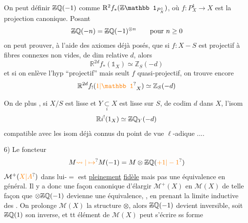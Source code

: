 On peut définir $\deleted{\mathbb Z}\mathbb Q(-1)$ comme %
$\mathrm R^2 f_*(\deleted{\mathbb Z}\mathbb 1_{P^1_X})$, où $f:P_X^1\longrightarrow X$ est la %
projection canonique. Posant %
\[
\deleted{\mathbb Z}\mathbb Q(-n)=\deleted{\mathbb Z}\mathbb Q(-1)^{\otimes n}\qquad\text{pour }n\geq0 %
\]
on peut prouver, à l'aide des %
axiomes déjà posés, que si $f:X-S$ %
est  projectif à fibres  connexes non vides, %
 de dim relative $d$, alors %
\[
\mathbb R^{2d}f_*(\mathbb 1_X)\simeq\mathbb Z_S(-d) %
\]
et si on enlève l'hyp ``projectif'' mais %
seult $f$ quasi-projectif, on trouve encore %
\[
\mathbb R^{2d} f_!(\unsure{1|\mathbb 1}_X)\simeq\mathbb Z_S(-d) %
\]

On   de plus ,  si $X/S$ est %
lisse et $Y\underset{i}{\subset}X$ est lisse sur $S$, de codim %
$d$ dans $X$, l'isom %
\[
\mathbb R i^!(1_X)\simeq\deleted{\mathbb Z}\mathbb Q_Y(-d) %
\]
compatible avec les isom déjà connus %
du point de vue $\ell$-adique .... %

6)  %
Le foncteur %
\[
M\unsure{\leadsto|\mapsto}M(-1)=M\otimes\deleted{\mathbb Z}\mathbb Q(\unsure{+1|-1}) %
\]
 $\mathcal M^+(\unsure{X|A})$ dans lui-$=$ est \uline{pleinement} \uline{fidèle} %
mais pas une équivalence en général. %
Il y a donc une façon canonique %
d'élargir $\mathcal M^+(X)$ en  $\mathcal M(X)$ de telle façon %
que  $\otimes\deleted{\mathbb Z}\mathbb Q(-1)$ devienne une équivalence, %
, en prenant la limite inductive %
des %
. On prolonge %
$\mathcal M(X)$ la structure $\otimes$, alors $\deleted{\mathbb Z}\mathbb Q(-1)$ %
devient inversible, soit $\deleted{\mathbb Z}\mathbb Q(1)$ son inverse, et %
tt élément de $\mathcal M(X)$ peut s'écrire ss forme %


